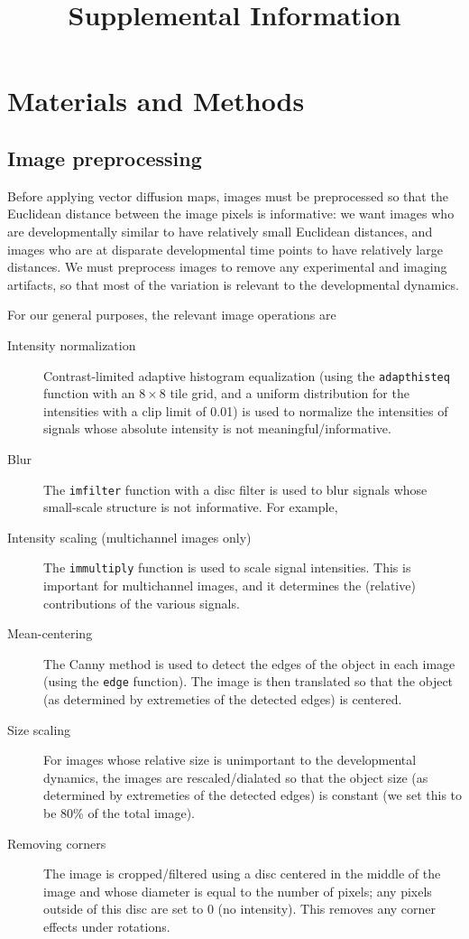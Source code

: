\documentclass[10pt,twocolumn]{article}
\title{Supplemental Information}
\date{}
\begin{document}
\maketitle


\section*{Materials and Methods}

\subsection*{Image preprocessing}

Before applying vector diffusion maps, images must be preprocessed so that the Euclidean distance between the image pixels is informative: we want images who are developmentally similar to have relatively small Euclidean distances, and images who are at disparate developmental time points to have relatively large distances. 
%
We must preprocess images to remove any experimental and imaging artifacts, so that most of the variation is relevant to the developmental dynamics. 

For our general purposes, the relevant image operations are 
\begin{description}

\item[Intensity normalization] Contrast-limited adaptive histogram equalization (using the \texttt{adapthisteq} function with an $8 \times 8$ tile grid, and a uniform distribution for the intensities with a clip limit of 0.01) is used to normalize the intensities of signals whose absolute intensity is not meaningful/informative.
%
\item[Blur] The \texttt{imfilter} function with a disc filter is used to blur signals whose small-scale structure is not informative. For example, 
%
\item[Intensity scaling (multichannel images only)] The \texttt{immultiply} function is used to scale signal intensities. This is important for multichannel images, and it determines the (relative) contributions of the various signals.  
%
\item[Mean-centering]  The Canny method \citep{canny1986computational} is used to detect the edges of the object in each image (using the \texttt{edge} function). The image is then translated so that the object (as determined by extremeties of the detected edges) is centered.
%
\item[Size scaling] For images whose relative size is unimportant to the developmental dynamics, the images are rescaled/dialated so that the object size (as determined by extremeties of the detected edges) is constant (we set this to be 80\% of the total image).
%
\item[Removing corners] The image is cropped/filtered using a disc centered in the middle of the image and whose diameter is equal to the number of pixels; any pixels outside of this disc are set to 0 (no intensity). This removes any corner effects under rotations. 
\end{description}
\end{document}
